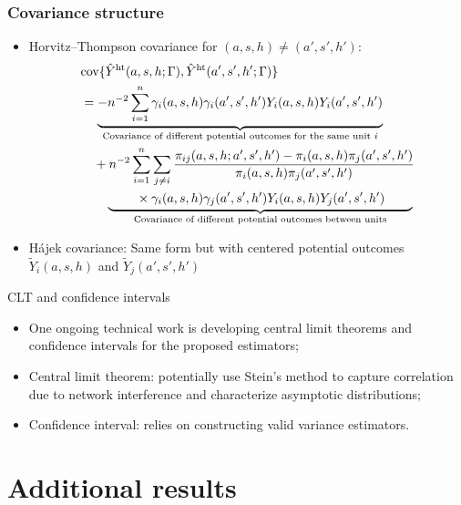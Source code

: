 \documentclass[aspectratio=169]{beamer}
\newcommand{\cov}{\textup{cov}}
\newcommand{\sumi}{\sum_{i=1}^n}
\newcommand{\horthom}{\textup{ht}}
\newcommand{\pscore}[1]{\pi_{#1}}
\begin{document}
\begin{frame}
\frametitle{Covariance structure}
\begin{itemize}
    \item Horvitz--Thompson covariance
    for $(a,s,h) \neq (a',s',h')$:
    \pause 
    \begin{align*}
    &\cov\{\hat{Y}^{\horthom}(a,s,h;\Gamma), \hat{Y}^{\horthom}(a',s',h';\Gamma)\} \\
    &= \underbrace{-n^{-2}\sumi \gamma_i(a,s,h)\gamma_i(a',s',h')Y_i(a,s,h)Y_i(a',s',h')}_{\text{Covariance of different potential outcomes for the same unit $i$}} \\
    &\quad + n^{-2}\sumi\sum_{j\neq i}\frac{\pscore{ij}(a,s,h;a',s',h') - \pscore{i}(a,s,h)\pscore{j}(a',s',h')}{\pscore{i}(a,s,h)\pscore{j}(a',s',h')} \\
    &\qquad \underbrace{\phantom{hello}\times \gamma_i(a,s,h)\gamma_j(a',s',h')Y_i(a,s,h)Y_j(a',s',h')\phantom{hello}}_{\text{Covariance of different potential outcomes between units}}
    \end{align*}

    \pause 
    \item {H\'{a}jek covariance:} Same form but with centered potential outcomes $\tilde{Y}_i(a,s,h)$ and $\tilde{Y}_j(a',s',h')$
\end{itemize}

\end{frame}

\begin{frame}{CLT and confidence intervals}
    \begin{itemize}
    \pause 
        \item One ongoing technical work is developing central limit theorems and confidence intervals for the proposed estimators;
    \pause 

        \item Central limit theorem: potentially use Stein's method to capture correlation due to network interference and characterize asymptotic distributions;
    \pause 

        \item Confidence interval: relies on constructing valid variance estimators. 
    \end{itemize}
\end{frame}

\section{Additional results}
\end{document}
